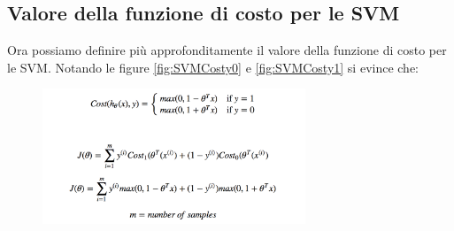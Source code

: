 \subsection{Valore della funzione di costo per le SVM}
Ora possiamo definire più approfonditamente il valore della funzione di costo per le SVM. Notando le figure \ref{fig:SVMCosty0} e \ref{fig:SVMCosty1} si evince che:
\begin{figure}[H]
    \centering
    \includegraphics[width=0.7\textwidth]{img/SVMCostFunctionValue.png}
\end{figure}
